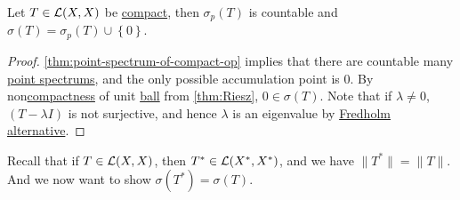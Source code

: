 \begin{corollary}
	Let \(T\in \mathcal{\MakeUppercase{l}} (X, X)\) be \hyperref[def:compact-op]{compact}, then \(\sigma _p(T)\) is countable and \(\sigma (T) = \sigma _p(T) \cup \left\{ 0 \right\} \).
\end{corollary}
\begin{proof}
	\autoref{thm:point-spectrum-of-compact-op} implies that there are countable many \hyperref[def:point-spectrum]{point spectrums}, and the only possible accumulation point is \(0\). By non\hyperref[def:compact]{compactness} of unit \hyperref[def:ball]{ball} from \autoref{thm:Riesz}, \(0\in \sigma (T)\). Note that if \(\lambda \neq 0\), \((T - \lambda I)\) is not surjective, and hence \(\lambda \) is an eigenvalue by \hyperref[thm:Fredholm-alternative]{Fredholm alternative}.
\end{proof}

Recall that if \(T\in \mathcal{\MakeUppercase{l}} (X, X)\), then \(T^{\ast} \in \mathcal{\MakeUppercase{l}} (X^{\ast} , X^{\ast} )\), and we have \(\lVert T^{\ast}  \rVert = \lVert T \rVert \). And we now want to show \(\sigma (T^{\ast} ) = \sigma (T)\).

